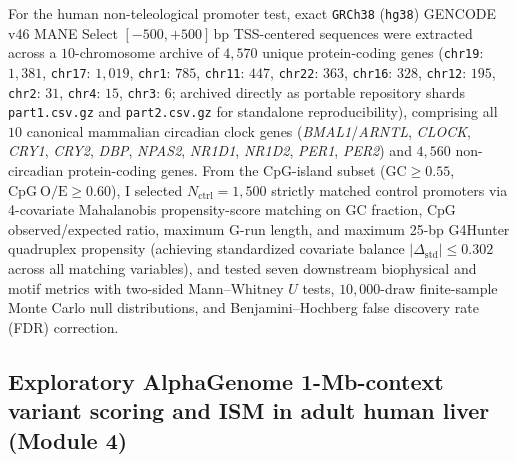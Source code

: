 \documentclass[10pt,letterpaper]{article}
\theoremstyle{plain}
\theoremstyle{definition}
\begin{document}
For the human non-teleological promoter test, exact \texttt{GRCh38} (\texttt{hg38}) GENCODE v46 MANE Select $[-500, +500]\,\mathrm{bp}$ TSS-centered sequences were extracted across a $10$-chromosome archive of $4{,}570$ unique protein-coding genes (\texttt{chr19}: $1{,}381$, \texttt{chr17}: $1{,}019$, \texttt{chr1}: $785$, \texttt{chr11}: $447$, \texttt{chr22}: $363$, \texttt{chr16}: $328$, \texttt{chr12}: $195$, \texttt{chr2}: $31$, \texttt{chr4}: $15$, \texttt{chr3}: $6$; archived directly as portable repository shards \texttt{part1.csv.gz} and \texttt{part2.csv.gz} for standalone reproducibility), comprising all $10$ canonical mammalian circadian clock genes (\emph{BMAL1}/\emph{ARNTL}, \emph{CLOCK}, \emph{CRY1}, \emph{CRY2}, \emph{DBP}, \emph{NPAS2}, \emph{NR1D1}, \emph{NR1D2}, \emph{PER1}, \emph{PER2}) and $4{,}560$ non-circadian protein-coding genes. From the CpG-island subset ($\mathrm{GC} \ge 0.55$, $\mathrm{CpG\ O/E} \ge 0.60$), I selected $N_{\mathrm{ctrl}} = 1{,}500$ strictly matched control promoters via 4-covariate Mahalanobis propensity-score matching on GC fraction, CpG observed/expected ratio, maximum G-run length, and maximum 25-bp G4Hunter quadruplex propensity (achieving standardized covariate balance $|\Delta_{\mathrm{std}}| \le 0.302$ across all matching variables), and tested seven downstream biophysical and motif metrics with two-sided Mann--Whitney $U$ tests, $10{,}000$-draw finite-sample Monte Carlo null distributions, and Benjamini--Hochberg false discovery rate (FDR) correction.

\subsection*{Exploratory AlphaGenome 1-Mb-context variant scoring and ISM in adult human liver (Module 4)}
\end{document}
